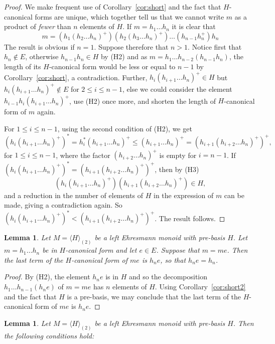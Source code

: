 \documentclass[12pt]{amsart}
\newtheorem{lem}[them]{Lemma}
\theoremstyle{definition}
\theoremstyle{definition}
\numberwithin{them}{section}
\numberwithin{equation}{section}
\begin{document}
{{\begin{proof}
We  make frequent use of Corollary~\ref{cor:short} and the fact that $H$-canonical forms are unique, 
which  together tell us that we cannot write $m$ as a  product of {\em fewer} than $n$ elements of $H$.  
If $m=h_1\dots h_n$ it is clear that 
\[m=(h_1(h_2\dots h_n)^+)(h_2(h_3\dots h_n)^+)\dots (h_{n-1}h_n^+)h_n\]
The result is obvious if $n=1$. Suppose therefore that $n>1$. Notice first that $h_n\notin E$, 
otherwise $h_{n-1}h_n\in H$  by (H2) and 
as $m=h_1\dots h_{n-2}(h_{n-1}h_n)$,  the length of its $H$-canonical form would be less or equal to $n-1$ by Corollary~\ref{cor:short}, a contradiction. 
Further,  
 $h_i(h_{i+1}\dots h_n)^+\in H$ but $h_i(h_{i+1}\dots h_n)^+\notin E$ for  $2\leq i\leq n-1$, else we  could consider the element  $h_{i-1}h_i(h_{i+1}\dots h_n)^+$,  use  (H2) once more,
 and shorten the length of $H$-canonical form of $m$ again.
 

For $1\leq i\leq n-1$, using the second condition of (H2), we get 
\[(h_i(h_{i+1}\dots h_n)^+)^*=h_i^*(h_{i+1}\dots h_n)^+\leq (h_{i+1}\dots h_n)^+=(h_{i+1}(h_{i+2}\dots h_n)^+)^+,\] for
$1\leq i\leq n-1$, 
where the factor $(h_{i+2}\dots h_n)^+$ is  empty  for $i=n-1$. If $(h_i(h_{i+1}\dots h_n)^+)^*=(h_{i+1}(h_{i+2}\dots h_n)^+)^+$, then  by (H3) 
\[(h_i(h_{i+1}\dots h_n)^+)(h_{i+1}(h_{i+2}\dots h_n)^+)\in H,\] and a  reduction in the number of elements of $H$ in the expression of $m$ can be made, giving a contradiction again. 
So $(h_i(h_{i+1}\dots h_n)^+)^*<(h_{i+1}(h_{i+2}\dots h_n)^+)^+$.  The result follows.\end{proof}


\begin{lem}\label{some help}
Let $M=\langle H\rangle_{(2)}$ be a left Ehresmann monoid with pre-basis $H$. Let $m=h_1\dots h_n$ be in $H$-canonical form and let $e\in E$.  Suppose that $m=me$.  Then the last term of the $H$-canonical form of $me$ is $h_ne$, so that $h_ne=h_n$. 
\end{lem}
\begin{proof}
 By (H2), the element $h_ne$ is in $H$  and so the decomposition 
$h_1\dots h_{n-1}(h_ne)$ of  $m=me$  has  $n$ elements of $H$. Using Corollary~\ref{cor:short2}
and the fact that  $H$ is a pre-basis, we may conclude that the last term of the $H$-canonical form of $me$ is $h_ne$. 
 
\end{proof}

\begin{lem}\label{prop}\label{prop:extra} 
Let $M=\langle H\rangle_{(2)}$ be a left Ehresmann monoid with 
pre-basis $H$. Then the following conditions hold:


\end{lem}}}
\end{document}
